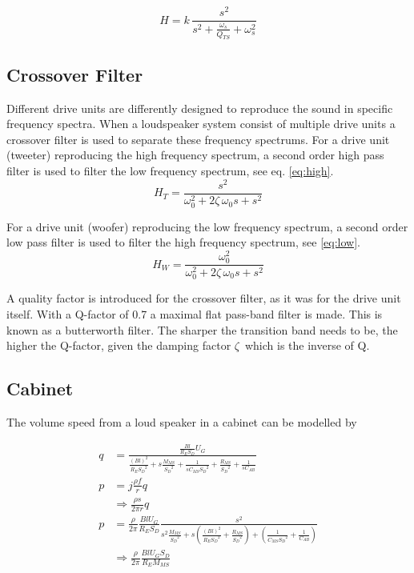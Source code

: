 \begin{equation}
H = k\,\dfrac{s^2}{s^2+\frac{\omega_s}{Q_{TS}}+\omega_s^2}
\label{eq:dutfderived}
\end{equation}

\subsection{Crossover Filter}
Different drive units are differently designed to reproduce the sound in specific frequency spectra.
When a loudspeaker system consist of multiple drive units a crossover filter is used to separate these frequency spectrums.
For a drive unit (tweeter) reproducing the high frequency spectrum, a second order high pass filter is used to filter the low frequency spectrum, see eq. \ref{eq:high}.\cite[p.~82-83]{Elektroakustik}
\begin{equation}
H_{T} = \frac{s^2}{\omega_0^2+2\zeta\,\omega_0 s+s^2}
\label{eq:high}
\end{equation}

For a drive unit (woofer) reproducing the low frequency spectrum, a second order low pass filter is used to filter the high frequency spectrum, see \cref{eq:low}.
\begin{equation}
H_{W} = \frac{\omega_0^2}{\omega_0^2+2\zeta\,\omega_0 s+s^2}
\label{eq:low}
\end{equation}

A quality factor is introduced for the crossover filter, as it was for the drive unit itself. 
With a Q-factor of 0.7 a maximal flat pass-band filter is made.
This is known as a butterworth filter. 
The sharper the transition band needs to be, the higher the Q-factor, given the damping factor $\zeta\,$ which is the inverse of Q. 

\subsection{Cabinet}

The volume speed from a loud speaker in a cabinet can be modelled by \

\begin{align}
	q &= \frac{\frac{Bl}{R_E S_D}U_G}{\frac{\left(Bl\right)^2}{R_E {S_D}^2} + s\frac{M_{MS}}{{S_D}^2}+\frac{1}{s C_{MS} {S_D}^2}+\frac{R_{MS}}{{S_D}^2}+\frac{1}{s C_{AB}}} \\
	p &= j\frac{\rho f}{r}q \\
	&\Rightarrow \frac{\rho s}{2\pi r}q \\
	p &= \frac{\rho}{2\pi}\frac{Bl U_G}{R_E S_D}\frac{s^2}{s^2\frac{M_{MS}}{{S_D}^2}+s\left(\frac{\left(Bl\right)^2}{R_E {S_D}^2} + \frac{R_{MS}}{{S_D}^2}\right) + \left(\frac{1}{C_{MS}{S_D}^2} + \frac{1}{C_{AB}}\right)} \\
	&\Rightarrow \frac{\rho}{2\pi}\frac{BlU_G S_D}{R_E M_{MS}}
\end{align}

